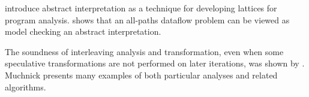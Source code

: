 \documentclass[blockstyle,preprint,natbib,nocopyrightspace]{sigplanconf}
\newcounter{codeline}
\begin{document}
\ifcutting
\citet{cousot:abstract-interpretation:1977}
\else
\citet{cousot:abstract-interpretation:1977,cousot:systematic-analysis-frameworks}
\fi
introduce abstract interpretation as a technique for developing
lattices for program analysis.
\citet{schmidt:data-flow-analysis-model-checking} shows that
an all-paths dataflow problem can be viewed as model checking an
abstract interpretation.

The soundness of interleaving analysis and transformation,
even when some speculative transformations are not performed on later
iterations, was shown by
\citet{lerner-grove-chambers:2002}.
\ifcutting\else
Muchnick \citeyearpar{muchnick:compiler-implementation} 
presents many examples of both particular analyses and related
algorithms.
\fi


\newcommand\T{\rule{0pt}{0.6ex}}
\newcommand\B{\rule[-0.05ex]{0pt}{0pt}}
\renewcommand\B{\relax\par\unskip\vspace*{0.8ex}%
  \hrule height 0pt depth 0pt \relax}
\renewcommand\T{\relax\par\unskip\vspace*{1.0ex}%
  \hrule height 0pt depth 0pt \relax}
\newcolumntype{L}{>{\T\Large\bfseries}m{1.3in}<{\centering}}       %
\newcommand\fillindent{\parindent=0pt \leftskip=0pt plus 1fill}
\newcommand\ltab[1]{\begin{tabular}{@{}c@{}}#1\\\end{tabular}}
\renewcommand\ltab[1]{{\let\\=\relax#1}}
\newenvironment{codetable}
  {\setcounter{codeline}{0}%
   \let\code=\numberedcode
   \let\endcode=\endnumberedcode
   \begin{tabular}{CL}%
  }
  {\end{tabular}}
\end{document}

